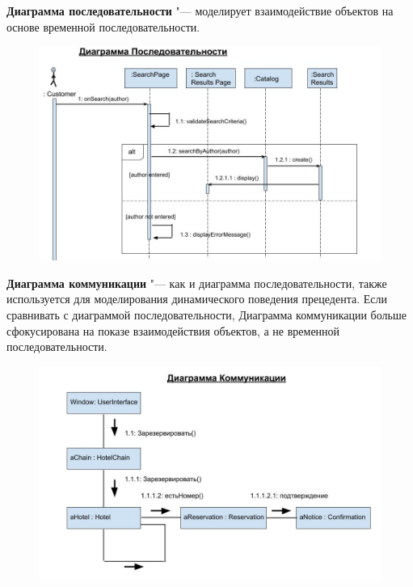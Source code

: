 \documentclass[bachelor, och, pract]{SCWorks}
\theoremstyle{remark}
\begin{document}
    \newpage
    \textbf{Диаграмма последовательности} "--- моделирует взаимодействие объектов на основе временной последовательности. 
    
    \begin{figure}[H]
        \begin{center}
            \includegraphics[scale=0.5]{res/sequence-diagram.png}
        \end{center}
    \end{figure}

    \newpage
    \textbf{Диаграмма коммуникации} "--- как и диаграмма последовательности, также используется для моделирования динамического поведения прецедента. Если сравнивать с диаграммой последовательности, Диаграмма коммуникации больше сфокусирована на показе взаимодействия объектов, а не временной последовательности. 
    
    \begin{figure}[H]
        \begin{center}
            \includegraphics[scale=0.5]{res/communication-diagram.png}
        \end{center}
    \end{figure}
    
\end{document}
